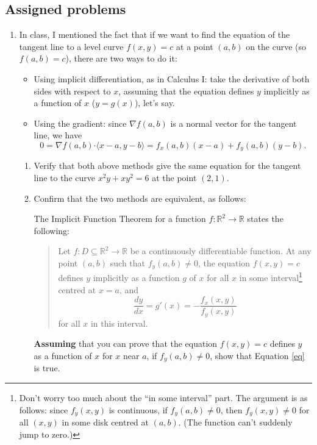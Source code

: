 \documentclass[letterpaper,12pt]{article}
\newcommand{\R}{\mathbb{R}}
\newcommand{\dotp}{\boldsymbol{\cdot}}
\begin{document}
\subsection*{Assigned problems}
\begin{enumerate}
 \item In class, I mentioned the fact that if we want to find the equation of the tangent line to a level curve $f(x,y)=c$ at a point $(a,b)$ on the curve (so $f(a,b)=c$), there are two ways to do it:
\begin{itemize}
 \item Using implicit differentiation, as in Calculus I: take the derivative of both sides with respect to $x$, assuming that the equation defines $y$ implicitly as a function of $x$ ($y=g(x)$), let's say.
 \item Using the gradient: since $\nabla f(a,b)$ is a normal vector for the tangent line, we have 
\begin{equation}\label{qe}
 0=\nabla f(a,b)\dotp \langle x-a, y-b\rangle = f_x(a,b)(x-a)+f_y(a,b)(y-b).
\end{equation}
\end{itemize}
\begin{enumerate}
 \item Verify that both above methods give the same equation for the tangent line to the curve $x^2y+xy^2=6$ at the point $(2,1)$.
 \item Confirm that the two methods are equivalent, as follows:

The Implicit Function Theorem for a function $f:\R^2\to\R$ states the following:
\begin{quotation}
 Let $f:D\subseteq \R^2\to \R$ be a continuously differentiable function. At any point $(a,b)$ such that $f_y(a,b)\neq 0$, the equation $f(x,y)=c$ defines $y$ implicitly as a function $g$ of $x$ for all $x$ in some interval\footnote{Don't worry too much about the ``in some interval'' part. The argument is as follows: since $f_y(x,y)$ is continuous, if $f_y(a,b)\neq 0$, then $f_y(x,y)\neq 0$ for all $(x,y)$ in some disk centred at $(a,b)$. (The function can't suddenly jump to zero.)} centred at $x=a$, and
\begin{equation}\label{eq}
 \frac{dy}{dx} = g'(x) = - \frac{f_x(x,y)}{f_y(x,y)}
\end{equation}
for all $x$ in this interval.
\end{quotation}
{\bf Assuming} that you can prove that the equation $f(x,y)=c$ defines $y$ as a function of $x$ for $x$ near $a$, if $f_y(a,b)\neq 0$, show that Equation \eqref{eq} is true.


\end{enumerate}
\end{enumerate}
\end{document}
